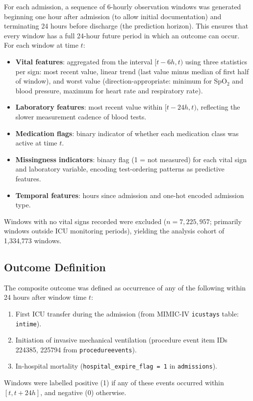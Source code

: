 \documentclass[12pt]{article}
\begin{document}
For each admission, a sequence of 6-hourly observation windows was generated
beginning one hour after admission (to allow initial documentation) and
terminating 24 hours before discharge (the prediction horizon). This ensures
that every window has a full 24-hour future period in which an outcome can
occur. For each window at time $t$:
\begin{itemize}[noitemsep]
  \item \textbf{Vital features}: aggregated from the interval $[t - 6h, t)$
        using three statistics per sign: most recent value, linear trend
        (last value minus median of first half of window), and worst value
        (direction-appropriate: minimum for SpO$_2$ and blood pressure,
        maximum for heart rate and respiratory rate).
  \item \textbf{Laboratory features}: most recent value within $[t - 24h, t)$,
        reflecting the slower measurement cadence of blood tests.
  \item \textbf{Medication flags}: binary indicator of whether each medication
        class was active at time $t$.
  \item \textbf{Missingness indicators}: binary flag (1 = not measured) for
        each vital sign and laboratory variable, encoding test-ordering patterns
        as predictive features.
  \item \textbf{Temporal features}: hours since admission and one-hot encoded
        admission type.
\end{itemize}

Windows with no vital signs recorded were excluded ($n = 7{,}225{,}957$;
primarily windows outside ICU monitoring periods), yielding the analysis cohort
of 1{,}334{,}773 windows.

\subsection*{Outcome Definition}

The composite outcome was defined as occurrence of any of the following within
24 hours after window time $t$:
\begin{enumerate}[noitemsep]
  \item First ICU transfer during the admission (from MIMIC-IV
        \texttt{icustays} table: \texttt{intime}).
  \item Initiation of invasive mechanical ventilation (procedure event item
        IDs 224385, 225794 from \texttt{procedureevents}).
  \item In-hospital mortality (\texttt{hospital\_expire\_flag = 1} in
        \texttt{admissions}).
\end{enumerate}
Windows were labelled positive (1) if any of these events occurred within
$[t, t + 24h]$, and negative (0) otherwise.
\end{document}
